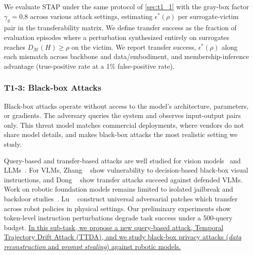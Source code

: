  We evaluate STAP under the same protocol of \autoref{sec:t1_1} with the gray-box factor $\gamma_{g}=0.8$ across various attack settings, estimating $\epsilon^{*}(\rho)$ per surrogate-victim pair in the transferability matrix. 
We define transfer success as the fraction of evaluation episodes where a perturbation synthesized entirely on surrogates reaches $D_{\mathcal{M}}(H)\ge\rho$ on the victim. We report transfer success, $\epsilon^{*}(\rho)$ along each mismatch across backbone and data/embodiment, and membership-inference advantage (true-positive rate at a 1\% false-positive rate).

\subsubsection{T1-3: Black-box Attacks} \label{sec:t1_3}
Black-box attacks operate without access to the model's architecture, parameters, or gradients. The adversary queries the system and observes input-output pairs only. This threat model matches commercial deployments, where vendors do not share model details, and makes black-box attacks the most realistic setting we study.

 Query-based and transfer-based attacks are well studied for vision models~\cite{guo2019simple,hallyburton2022security,abdukhamidov2022black,juraev2024attack,abdukhamidov2023microbial} and LLMs~\cite{li2023deepinception,yao2024fuzzllm,ding-etal-2024-wolf,wei2023jailbreak,deng2024pandora}. For VLMs, Zhang \etal~\cite{zhang2024avibench} show vulnerability to decision-based black-box visual instructions, and Dong \etal~\cite{dong2023robust} show transfer attacks succeed against defended VLMs. Work on robotic foundation models remains limited to isolated jailbreak and backdoor studies~\cite{badvla,advvla}. Lu \etal~\cite{lu2026whenrobots} construct universal adversarial patches which transfer across robot policies in physical settings. Our preliminary experiments show token-level instruction perturbations degrade task success under a 500-query budget.
\ul{In this sub-task, we propose a new query-based attack, Temporal Trajectory Drift Attack (TTDA), and we study black-box privacy attacks (\eg \emph{data reconstruction} and \emph{prompt stealing}) against robotic models.}

